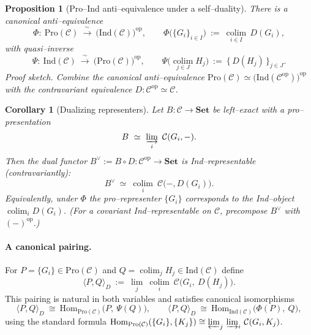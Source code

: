 \documentclass[11pt]{article}
\theoremstyle{upright}
\newtheorem{corollary}{Corollary}
\newtheorem{proposition}{Proposition}
\begin{document}
\begin{proposition}[Pro–Ind anti–equivalence under a self–duality]\label{prop:pro-ind-duality}
There is a canonical anti–equivalence
\[
\Phi:\ \mathrm{Pro}(\mathcal C)\ \xrightarrow{\ \sim\ }\ \big(\mathrm{Ind}(\mathcal C)\big)^{\mathrm{op}},
\qquad
\Phi\!\big(\{G_i\}_{i\in I}\big)\ :=\ \operatorname*{colim}_{i\in I}\, D(G_i),
\]
with quasi–inverse
\[
\Psi:\ \mathrm{Ind}(\mathcal C)\ \xrightarrow{\ \sim\ }\ \big(\mathrm{Pro}(\mathcal C)\big)^{\mathrm{op}},
\qquad
\Psi\!\big(\operatorname*{colim}_{j\in J} H_j\big)\ :=\ \{\,D(H_j)\,\}_{j\in J}.
\]
\emph{Proof sketch.} Combine the canonical anti–equivalence $\mathrm{Pro}(\mathcal C)\simeq\big(\mathrm{Ind}(\mathcal C^{\mathrm{op}})\big)^{\mathrm{op}}$ with the contravariant equivalence $D:\mathcal C^{\mathrm{op}}\!\simeq\!\mathcal C$.
\end{proposition}

\begin{corollary}[Dualizing representers]\label{cor:dualizing-representers}
Let $B:\mathcal C\to\mathbf{Set}$ be left–exact with a pro–presentation
\[
B\ \simeq\ \varinjlim_{i}\ \mathcal C(G_i,-).
\]
Then the \emph{dual} functor $B^{\vee}:=B\circ D:\mathcal C^{\mathrm{op}}\to\mathbf{Set}$ is Ind–representable (contravariantly):
\[
B^{\vee}\ \simeq\ \operatorname*{colim}_{i}\ \mathcal C\big(-,D(G_i)\big).
\]
Equivalently, under $\Phi$ the pro–representer $\{G_i\}$ corresponds to the Ind–object $\operatorname*{colim}_i D(G_i)$. (For a \emph{covariant} Ind–representable on $\mathcal C$, precompose $B^{\vee}$ with $(-)^{\mathrm{op}}$.)
\end{corollary}

\paragraph{A canonical pairing.}
For $P=\{G_i\}\in\mathrm{Pro}(\mathcal C)$ and $Q=\operatorname*{colim}_j H_j\in\mathrm{Ind}(\mathcal C)$ define
\[
\langle P,Q\rangle_D\ :=\ \operatorname*{lim}_{j}\ \operatorname*{colim}_{i}\ \mathcal C\big(G_i,\ D(H_j)\big).
\]
This pairing is natural in both variables and satisfies canonical isomorphisms
\[
\langle P,Q\rangle_D\ \cong\ \mathrm{Hom}_{\mathrm{Pro}(\mathcal C)}\!\big(P,\ \Psi(Q)\big),
\qquad
\langle P,Q\rangle_D\ \cong\ \mathrm{Hom}_{\mathrm{Ind}(\mathcal C)}\!\big(\Phi(P),\ Q\big),
\]
using the standard formula $\mathrm{Hom}_{\mathrm{Pro}(\mathcal C)}(\{G_i\},\{K_j\})\cong \varprojlim_{j}\,\varinjlim_{i}\,\mathcal C(G_i,K_j)$.
\end{document}
